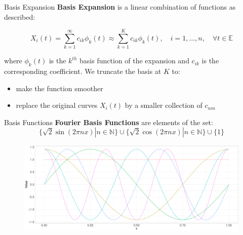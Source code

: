 \documentclass{beamer}
\begin{document}
	\begin{frame}{Basis Expansion}
		\textbf{Basis Expansion} is a linear combination of functions as described:
		
		$$X_{i}(t) = \sum_{k=1}^{\infty} c_{ik}\phi_{k}(t) \approx \sum_{k=1}^{K} c_{ik}\phi_{k}(t), \quad i = 1, \dots, n, \quad \forall t \in \mathbb{E}$$
		
		where $\phi_{k}(t)$ is the $k^{th}$ basis function of the expansion and $c_{ik}$ is the corresponding coefficient. We truncate the basis at $K$ to:
		\vspace{0.2cm}
		
		\begin{itemize}
			\item make the function smoother
			\item replace the original curves $X_{i}(t)$ by a smaller collection of $c_{nm}$
		\end{itemize}		
	\end{frame}
	
		
	
	\begin{frame}{Basis Functions}
		\textbf{Fourier Basis Functions} are elements of the set:
		$$\{\sqrt{2}\sin(2\pi nx) | n \in \mathbb{N}\} \cup \{\sqrt{2}\cos(2\pi nx) | n \in \mathbb{N}\} \cup \{1\}$$
		\vspace{-0.5cm}
		\begin{figure}
			\includegraphics[width = \textwidth]{../Graphics/Fourier_Basis.pdf}
		\end{figure}
			
	\end{frame}
	
\end{document}
